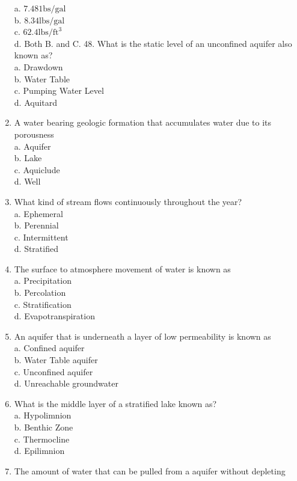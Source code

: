 \begin{enumerate}
a. $7.481 \mathrm{bs} / \mathrm{gal}$\\
b. $8.34 \mathrm{lbs} / \mathrm{gal}$\\
c. $62.4 \mathrm{lbs} / \mathrm{ft}^{3}$\\
d. Both B. and C. 48. What is the static level of an unconfined aquifer also known as?\\
a. Drawdown\\
b. Water Table\\
c. Pumping Water Level\\
d. Aquitard\\
\item A water bearing geologic formation that accumulates water due to its porousness\\
a. Aquifer\\
b. Lake\\
c. Aquiclude\\
d. Well\\
\item What kind of stream flows continuously throughout the year?\\
a. Ephemeral\\
b. Perennial\\
c. Intermittent\\
d. Stratified\\
\item The surface to atmosphere movement of water is known as\\
a. Precipitation\\
b. Percolation\\
c. Stratification\\
d. Evapotranspiration\\
\item An aquifer that is underneath a layer of low permeability is known as\\
a. Confined aquifer\\
b. Water Table aquifer\\
c. Unconfined aquifer\\
d. Unreachable groundwater\\
\item What is the middle layer of a stratified lake known as?\\
a. Hypolimnion\\
b. Benthic Zone\\
c. Thermocline\\
d. Epilimnion\\
\item The amount of water that can be pulled from a aquifer without depleting\\

\end{enumerate}
